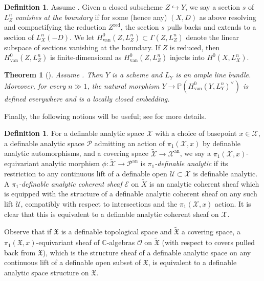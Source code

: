 \documentclass{amsart}
\newcommand{\an}{\operatorname{an}}
\newtheorem{thm}[theorem]{Theorem}
\theoremstyle{definition}
\newtheorem{defn}[theorem]{Definition}
\theoremstyle{remark}
\def\bC{\mathbb{C}}
\def\cE{\mathcal{E}}
\def\cO{\mathcal{O}}
\def\cP{\mathcal{P}}
\def\cU{\mathcal{U}}
\def\cX{\mathcal{X}}
\def\an{\mathrm{an}}
\numberwithin{equation}{section}
\begin{document}
\begin{defn}\label{vanishingsect}
Assume .  Given a closed subscheme $Z \hookrightarrow Y$, we say a section $s$ of $L^n_Z$ \emph{vanishes at the boundary} if for some (hence any) $(X,D)$ as above resolving and compactifying the reduction $Z^\mathrm{red}$, the section $s$ pulls backs and extends to a section of $L_{X}^n(-D)$.  We let $H^0_{\mathrm{van}}(Z,L^n_Z)\subset \Gamma(Z,L^n_Z)$ denote the linear subspace of sections vanishing at the boundary. If $Z$ is reduced, then $H^0_{\mathrm{van}}(Z,L^n_Z)$ is finite-dimensional as $H^0_{\mathrm{van}}(Z,L^n_Z)$ injects into $H^0(X,L_{ X}^n)$.
\end{defn}


\begin{thm}[{\cite[Theorem 5.4]{BBT23}}]\label{thm:vanishing}
Assume .  Then $Y$ is a scheme and $L_Y$ is an ample line bundle. Moreover, for every $n \gg 1$, the natural morphism $Y \rightarrow \mathbb{P}(H^0_{\mathrm{van}}(Y,L_Y^n)^\vee)$ is defined everywhere and is a locally closed embedding.
\end{thm}

Finally, the following notions will be useful; see \cite[\S3]{BBTshaf} for more details.

\begin{defn}\label{defn:pi1definable}For a definable analytic space $\cX$ with a choice of basepoint $x\in\cX$, a definable analytic space $\cP$ admitting an action of $\pi_1(\cX,x)$ by definable analytic automorphisms, and a covering space $\widetilde{\cX}\to \cX^\an$, we say a $\pi_1(\cX,x)$-equivariant analytic morphism $\phi:\widetilde{\cX}\to \cP^\an$ is \emph{$\pi_1$-definable analytic} if its restriction to any continuous lift of a definable open $\cU\subset\cX$ is definable analytic.  A \emph{$\pi_1$-definable analytic coherent sheaf} $\cE$ on $\widetilde{X}$ is an analytic coherent sheaf which is equipped with the structure of a definable analytic coherent sheaf on any such lift $\cU$, compatibly with respect to intersections and the $\pi_1(\cX,x)$ action. It is clear that this is equivalent to a definable analytic coherent sheaf on $\cX$.    
\end{defn}
Observe that if $\mathfrak{X} $ is a definable topological space and $\widetilde{\mathfrak{X}}$ a covering space, a $\pi_1(\mathfrak{X},x)$-equivariant sheaf of $\bC$-algebras $\cO$ on $\widetilde{\mathfrak{X}}$ (with respect to covers pulled back from $\mathfrak{X}$), which is the structure sheaf of a definable analytic space on any continuous lift of a definable open subset of $\mathfrak{X}$, is equivalent to a definable analytic space structure on $\mathfrak{X}$.
\end{document}
